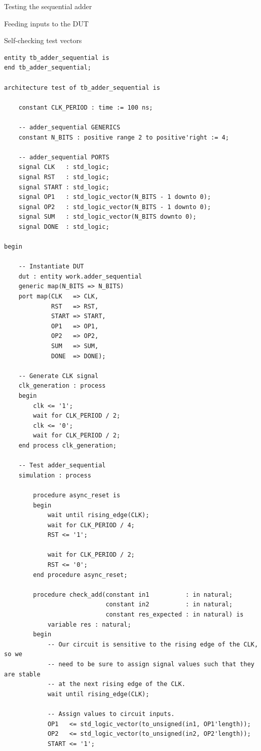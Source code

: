 \documentclass[lab]{course}
\begin{document}
\begin{section}{Testing the sequential adder}
\begin{subsection}{Feeding inputs to the DUT}
\begin{subsubsection}{Self-checking test vectors}
\begin{lstlisting}[caption={Add test vectors}, captionpos=b, label={lst:sequential_process_simulation_test_vectors}]
entity tb_adder_sequential is
end tb_adder_sequential;

architecture test of tb_adder_sequential is

    constant CLK_PERIOD : time := 100 ns;

    -- adder_sequential GENERICS
    constant N_BITS : positive range 2 to positive'right := 4;

    -- adder_sequential PORTS
    signal CLK   : std_logic;
    signal RST   : std_logic;
    signal START : std_logic;
    signal OP1   : std_logic_vector(N_BITS - 1 downto 0);
    signal OP2   : std_logic_vector(N_BITS - 1 downto 0);
    signal SUM   : std_logic_vector(N_BITS downto 0);
    signal DONE  : std_logic;

begin

    -- Instantiate DUT
    dut : entity work.adder_sequential
    generic map(N_BITS => N_BITS)
    port map(CLK   => CLK,
             RST   => RST,
             START => START,
             OP1   => OP1,
             OP2   => OP2,
             SUM   => SUM,
             DONE  => DONE);

    -- Generate CLK signal
    clk_generation : process
    begin
        clk <= '1';
        wait for CLK_PERIOD / 2;
        clk <= '0';
        wait for CLK_PERIOD / 2;
    end process clk_generation;

    -- Test adder_sequential
    simulation : process

        procedure async_reset is
        begin
            wait until rising_edge(CLK);
            wait for CLK_PERIOD / 4;
            RST <= '1';

            wait for CLK_PERIOD / 2;
            RST <= '0';
        end procedure async_reset;

        procedure check_add(constant in1          : in natural;
                            constant in2          : in natural;
                            constant res_expected : in natural) is
            variable res : natural;
        begin
            -- Our circuit is sensitive to the rising edge of the CLK, so we
            -- need to be sure to assign signal values such that they are stable
            -- at the next rising edge of the CLK.
            wait until rising_edge(CLK);

            -- Assign values to circuit inputs.
            OP1   <= std_logic_vector(to_unsigned(in1, OP1'length));
            OP2   <= std_logic_vector(to_unsigned(in2, OP2'length));
            START <= '1';


\end{lstlisting}
\end{subsubsection}
\end{subsection}
\end{section}
\end{document}
